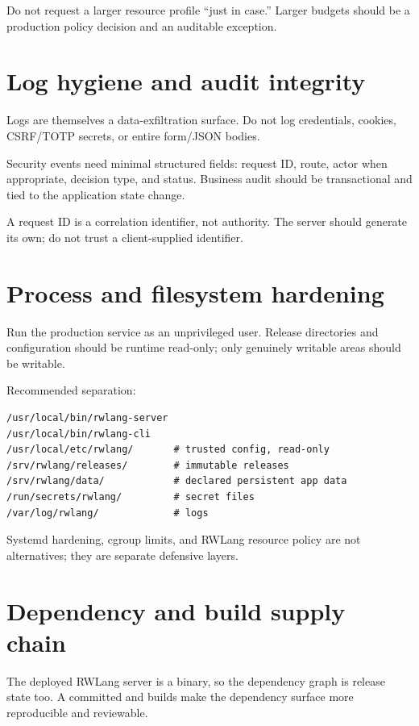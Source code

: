 Do not request a larger resource profile ``just in case.'' Larger budgets should be a production policy decision and an auditable exception.

\section{Log hygiene and audit integrity}

Logs are themselves a data-exfiltration surface. Do not log credentials, cookies, CSRF/TOTP secrets, or entire form/JSON bodies.

Security events need minimal structured fields: request ID, route, actor when appropriate, decision type, and status. Business audit should be transactional and tied to the application state change.

A request ID is a correlation identifier, not authority. The server should generate its own; do not trust a client-supplied identifier.

\section{Process and filesystem hardening}

Run the production service as an unprivileged user. Release directories and configuration should be runtime read-only; only genuinely writable areas should be writable.

Recommended separation:

\begin{lstlisting}
/usr/local/bin/rwlang-server
/usr/local/bin/rwlang-cli
/usr/local/etc/rwlang/       # trusted config, read-only
/srv/rwlang/releases/        # immutable releases
/srv/rwlang/data/            # declared persistent app data
/run/secrets/rwlang/         # secret files
/var/log/rwlang/             # logs
\end{lstlisting}

Systemd hardening, cgroup limits, and RWLang resource policy are not alternatives; they are separate defensive layers.

\section{Dependency and build supply chain}

The deployed RWLang server is a binary, so the dependency graph is release state too. A committed  and  builds make the dependency surface more reproducible and reviewable.

